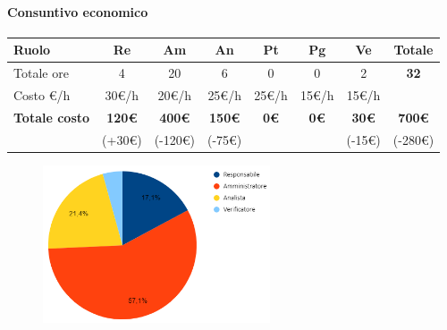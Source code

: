 \paragraph{Consuntivo economico}
\begin{center}
	\renewcommand{\arraystretch}{1.8} %
	\begin{tabular}{ |m{6em}|c|c|c|c|c|c|c| }
	\hline
	\textbf{Ruolo} & \textbf{Re} & \textbf{Am} &  \textbf{An} &  \textbf{Pt} &  \textbf{Pg} &  \textbf{Ve} &  \textbf{Totale}\\
    \hline
    Totale ore & 4 & 20 & 6 & 0 & 0 & 2 & \textbf{32}\\
    \hline
    Costo \euro/h & 30\euro/h & 20\euro/h & 25\euro/h & 25\euro/h & 15\euro/h & 15\euro/h & \\
    \hline
    \textbf{Totale costo} & \textbf{120\euro} & \textbf{400\euro} &  \textbf{150\euro} & \textbf{0\euro} &  \textbf{0\euro} &  \textbf{30\euro} &  \textbf{700\euro} \\
    & (+30\euro) & (-120\euro) & (-75\euro) &  &  & (-15\euro) & (-280\euro) \\
    \hline
	\end{tabular}

    \begin{figure}[H]
       \centering\includegraphics[width=0.6\textwidth, height=0.6\textheight, keepaspectratio]{images/consuntivo/RTB-documentale-costo.png}
    \end{figure}
\end{center}

